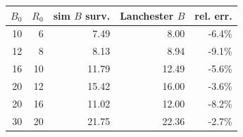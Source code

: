 \begin{tabular}{rrrrr}
\toprule
$B_0$ & $R_0$ & sim $B$ surv. & Lanchester $B$ & rel. err. \\
\midrule
10 & 6 & 7.49 & 8.00 & -6.4\% \\
12 & 8 & 8.13 & 8.94 & -9.1\% \\
16 & 10 & 11.79 & 12.49 & -5.6\% \\
20 & 12 & 15.42 & 16.00 & -3.6\% \\
20 & 16 & 11.02 & 12.00 & -8.2\% \\
30 & 20 & 21.75 & 22.36 & -2.7\% \\
\bottomrule
\end{tabular}
